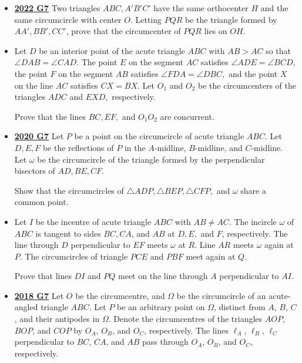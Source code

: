 \documentclass[11pt]{scrartcl}
\begin{document}
\begin{itemize}[leftmargin=*]
Prove that the orthocentre of $\mathcal T$, the circumcentre of $\mathcal T$, and $H$ are collinear.
    \item  \href{https://artofproblemsolving.com/community/c6h3107352p28104378}{\textbf{2022 G7}} Two triangles $ABC, A'B'C'$ have the same orthocenter $H$ and the same circumcircle with center $O$. Letting $PQR$ be the triangle formed by $AA', BB', CC'$, prove that the circumcenter of $PQR$ lies on $OH$.
\item {}  Let $D$ be an interior point of the acute triangle $ABC$ with $AB > AC$ so that $\angle DAB = \angle CAD.$ The point $E$ on the segment $AC$ satisfies $\angle ADE =\angle BCD,$ the point $F$ on the segment $AB$ satisfies $\angle FDA =\angle DBC,$ and the point $X$ on the line $AC$ satisfies $CX = BX.$ Let $O_1$ and $O_2$ be the circumcenters of the triangles $ADC$ and $EXD,$ respectively. 

Prove that the lines $BC, EF,$ and $O_1O_2$ are concurrent.
\item \href{https://artofproblemsolving.com/community/c6h2625883p22698237}{\textbf{2020 G7}} Let $P$ be a point on the circumcircle of acute triangle $ABC$. Let $D,E,F$ be the reflections of $P$ in the $A$-midline, $B$-midline, and $C$-midline. Let $\omega$ be the circumcircle of the triangle formed by the perpendicular bisectors of $AD, BE, CF$. 

Show that the circumcircles of $\triangle ADP, \triangle BEP, \triangle CFP,$ and $\omega$ share a common point.
\item {}  Let $I$ be the incentre of acute triangle $ABC$ with $AB\neq AC$. The incircle $\omega$ of $ABC$ is tangent to sides $BC, CA$, and $AB$ at $D, E,$ and $F$, respectively. The line through $D$ perpendicular to $EF$ meets $\omega$ at $R$. Line $AR$ meets $\omega$ again at $P$. The circumcircles of triangle $PCE$ and $PBF$ meet again at $Q$. 

Prove that lines $DI$ and $PQ$ meet on the line through $A$ perpendicular to $AI$.
\newpage

\item \href{https://artofproblemsolving.com/community/c6h1876778p12752860}{\textbf{2018 G7}} 	Let $O$ be the circumcentre, and $\Omega$ be the circumcircle of an acute-angled triangle $ABC$. Let $P$ be an arbitrary point on $\Omega$, distinct from $A$, $B$, $C$, and their antipodes in $\Omega$. Denote the circumcentres of the triangles $AOP$, $BOP$, and $COP$ by $O_A$, $O_B$, and $O_C$, respectively. The lines $\ell_A$, $\ell_B$, $\ell_C$ perpendicular to $BC$, $CA$, and $AB$ pass through $O_A$, $O_B$, and $O_C$, respectively. 


\end{itemize}
\end{document}
